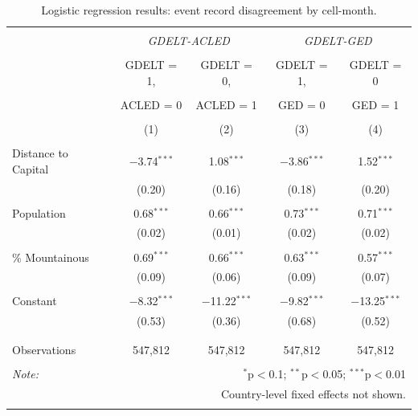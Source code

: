 \documentclass[hidelinks]{article}
\begin{document}
\begin{table}[!htbp] \centering 
\begin{tabular}{@{\extracolsep{5pt}}lcccc} 
\\[-1.8ex]\hline 
\hline \\[-1.8ex] 
 & \multicolumn{2}{c}{\textit{GDELT-ACLED}} & \multicolumn{2}{c}{\textit{GDELT-GED}}\\ 
\cline{2-5} 
\\[-1.8ex] & GDELT = 1, & GDELT = 0, & GDELT = 1, & GDELT = 0 \\ 
\\[-2.8ex] & ACLED = 0 & ACLED = 1 & GED = 0 & GED = 1 \\ 
\\[-1.8ex] & (1) & (2) & (3) & (4)\\ 
\hline \\[-1.8ex] 
 Distance to Capital & $-$3.74$^{***}$ & 1.08$^{***}$ & $-$3.86$^{***}$ & 1.52$^{***}$ \\ 
  & (0.20) & (0.16) & (0.18) & (0.20) \\ 
  & & & & \\ 
 Population & 0.68$^{***}$ & 0.66$^{***}$ & 0.73$^{***}$ & 0.71$^{***}$ \\ 
  & (0.02) & (0.01) & (0.02) & (0.02) \\ 
  & & & & \\ 
 \% Mountainous & 0.69$^{***}$ & 0.66$^{***}$ & 0.63$^{***}$ & 0.57$^{***}$ \\ 
  & (0.09) & (0.06) & (0.09) & (0.07) \\ 
  & & & & \\ 
 Constant & $-$8.32$^{***}$ & $-$11.22$^{***}$ & $-$9.82$^{***}$ & $-$13.25$^{***}$ \\ 
  & (0.53) & (0.36) & (0.68) & (0.52) \\ 
  & & & & \\ 
\hline \\[-1.8ex] 
Observations & 547,812 & 547,812 & 547,812 & 547,812 \\ 
\hline 
\hline \\[-1.8ex] 
\textit{Note:}  & \multicolumn{4}{r}{$^{*}$p$<$0.1; $^{**}$p$<$0.05; $^{***}$p$<$0.01} \\ 
			& \multicolumn{4}{r}{Country-level fixed effects not shown.} \\ 
\normalsize 
\end{tabular} 
  \caption{Logistic regression results: event record disagreement by cell-month.}\label{tab:regression1}
\end{table} 
\end{document}
